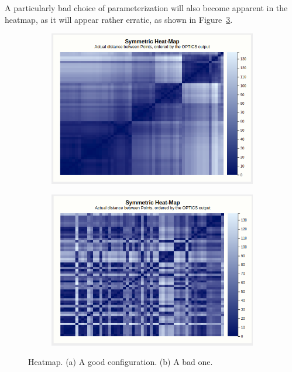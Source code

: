 \documentclass{vgtc}                          %
\begin{document}
A particularly bad choice of parameterization will also become apparent in the
heatmap, as it will appear rather erratic, as shown in
Figure~\ref{fig:heatmap-bad}.

\begin{figure}[tb]
    \centering

    \begin{subfigure}{0.45\columnwidth}
        \includegraphics[width=\columnwidth]{heatmap}
        \caption{}
        \label{fig:heatmap}
    \end{subfigure}%
    \hspace{1em}
    \begin{subfigure}{0.45\columnwidth}
        \includegraphics[width=\columnwidth]{heatmap-bad}
        \caption{}
        \label{fig:heatmap-bad}
    \end{subfigure}
    \caption{Heatmap. (a) A good configuration. (b) A bad one.}
\end{figure}
\end{document}

